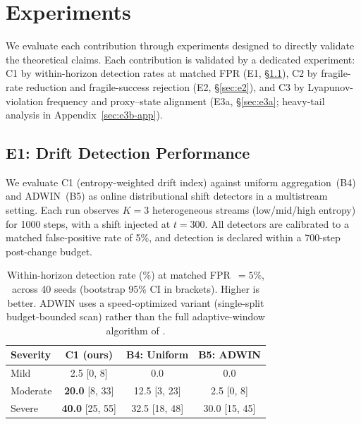 \documentclass{article}
\begin{document}
\section{Experiments}
\label{sec:experiments}


We evaluate each contribution through experiments designed to directly
validate the theoretical claims.
Each contribution is validated by a dedicated experiment:
C1 by within-horizon detection rates at matched FPR
(E1, \S\ref{sec:e1}),
C2 by fragile-rate reduction and fragile-success rejection
(E2, \S\ref{sec:e2}), and
C3 by Lyapunov-violation frequency and proxy--state alignment
(E3a, \S\ref{sec:e3a}; heavy-tail analysis in
Appendix~\ref{sec:e3b-app}).


\subsection{E1: Drift Detection Performance}
\label{sec:e1}

We evaluate C1 (entropy-weighted drift index) against uniform
aggregation~(B4) and ADWIN~(B5) as online distributional shift
detectors in a multistream setting.
Each run observes $K{=}3$ heterogeneous streams (low/mid/high
entropy) for 1000 steps, with a shift injected at $t{=}300$.
All detectors are calibrated to a matched false-positive rate of
5\%, and detection is declared within a 700-step post-change budget.

\begin{table}[t]
\centering
\caption{Within-horizon detection rate (\%) at matched FPR~$=5\%$,
  across 40 seeds (bootstrap 95\% CI in brackets). Higher is better.
  ADWIN uses a speed-optimized variant (single-split budget-bounded
  scan) rather than the full adaptive-window algorithm of
  \citet{bifet2007adwin}.}
\label{tab:e1-detection}
\small
\begin{tabular}{@{}lccc@{}}
\toprule
\textbf{Severity} & \textbf{C1 (ours)} & \textbf{B4: Uniform} & \textbf{B5: ADWIN} \\
\midrule
Mild      & 2.5 [0, 8]  & 0.0 & 0.0 \\
Moderate  & \textbf{20.0} [8, 33] & 12.5 [3, 23] & 2.5 [0, 8] \\
Severe    & \textbf{40.0} [25, 55] & 32.5 [18, 48] & 30.0 [15, 45] \\
\bottomrule
\end{tabular}
\end{table}
\end{document}
